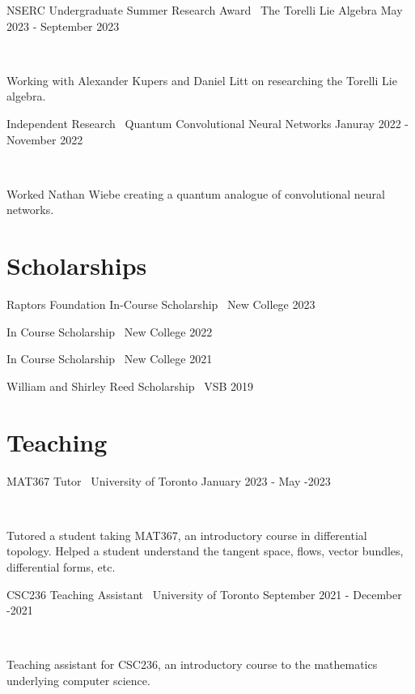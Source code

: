 \documentclass[]{style}
\begin{document}
\begin{entrylist}

\vspace{1mm}

\entry
{NSERC Undergraduate Summer Research Award \ {\normalfont The Torelli Lie Algebra}}
{May 2023 - September 2023}
{ ~ \vspace{-3.5mm}

Working with Alexander Kupers and Daniel Litt on researching the Torelli Lie algebra.}

\entry
{Independent Research \ {\normalfont Quantum Convolutional Neural Networks}}
{Januray 2022 - November 2022}
{ ~ \vspace{-3.5mm}

Worked Nathan Wiebe creating a quantum analogue of convolutional neural networks.}

\end{entrylist}

\section{Scholarships}

\begin{entrylist}

\vspace{-3mm}
\entry
{Raptors Foundation In-Course Scholarship \ {\normalfont New College}}
{2023}
{}

\vspace{-3mm}
\entry
{In Course Scholarship \ {\normalfont New College}}
{2022}
{}

\vspace{-3mm}
\entry
{In Course Scholarship \ {\normalfont New College}}
{2021}
{}

\vspace{-3mm}
\entry
{William and Shirley Reed Scholarship \ {\normalfont VSB}}
{2019}
{}

\end{entrylist}

\section{Teaching}

\begin{entrylist}

\vspace{1mm}

\entry
{MAT367 Tutor \ {\normalfont University of Toronto}}
{January 2023 - May -2023}
{ ~ \vspace{-2.5mm}

Tutored a student taking MAT367, an introductory course in differential topology. Helped a student understand the tangent space, flows, vector bundles, differential forms, etc.  
}

\entry
{CSC236 Teaching Assistant \ {\normalfont University of Toronto}}
{September 2021 - December -2021}
{ ~ \vspace{-2.5mm}

Teaching assistant for CSC236, an introductory course to the mathematics underlying computer science.
}


\end{entrylist}
\end{document}
